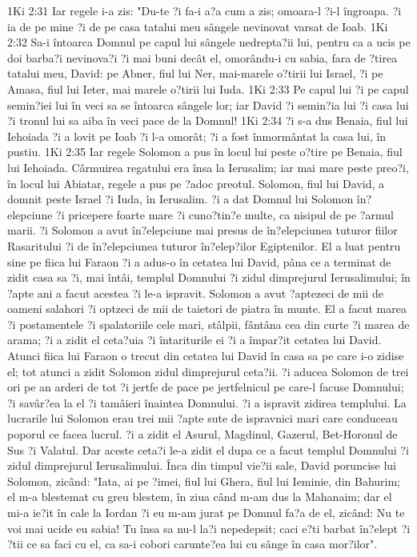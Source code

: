 1Ki 2:31  Iar regele i-a zis: "Du-te ?i fa-i a?a cum a zis; omoara-l ?i-l îngroapa. ?i ia de pe mine ?i de pe casa tatalui meu sângele nevinovat varsat de Ioab.
1Ki 2:32  Sa-i întoarca Domnul pe capul lui sângele nedrepta?ii lui, pentru ca a ucis pe doi barba?i nevinova?i ?i mai buni decât el, omorându-i cu sabia, fara de ?tirea tatalui meu, David: pe Abner, fiul lui Ner, mai-marele o?tirii lui Israel, ?i pe Amasa, fiul lui Ieter, mai marele o?tirii lui Iuda.
1Ki 2:33  Pe capul lui ?i pe capul semin?iei lui în veci sa se întoarca sângele lor; iar David ?i semin?ia lui ?i casa lui ?i tronul lui sa aiba în veci pace de la Domnul!
1Ki 2:34  ?i s-a dus Benaia, fiul lui Iehoiada ?i a lovit pe Ioab ?i l-a omorât; ?i a fost înmormântat la casa lui, în pustiu.
1Ki 2:35  Iar regele Solomon a pus în locul lui peste o?tire pe Benaia, fiul lui Iehoiada. Cârmuirea regatului era însa la Ierusalim; iar mai mare peste preo?i, în locul lui Abiatar, regele a pus pe ?adoc preotul. Solomon, fiul lui David, a domnit peste Israel ?i Iuda, în Ierusalim. ?i a dat Domnul lui Solomon în?elepciune ?i pricepere foarte mare ?i cuno?tin?e multe, ca nisipul de pe ?armul marii. ?i Solomon a avut în?elepciune mai presus de în?elepciunea tuturor fiilor Rasaritului ?i de în?elepciunea tuturor în?elep?ilor Egiptenilor. El a luat pentru sine pe fiica lui Faraon ?i a adus-o în cetatea lui David, pâna ce a terminat de zidit casa sa ?i, mai întâi, templul Domnului ?i zidul dimprejurul Ierusalimului; în ?apte ani a facut acestea ?i le-a ispravit. Solomon a avut ?aptezeci de mii de oameni salahori ?i optzeci de mii de taietori de piatra în munte. El a facut marea ?i postamentele ?i spalatoriile cele mari, stâlpii, fântâna cea din curte ?i marea de arama; ?i a zidit el ceta?uia ?i întariturile ei ?i a împar?it cetatea lui David. Atunci fiica lui Faraon o trecut din cetatea lui David în casa sa pe care i-o zidise el; tot atunci a zidit Solomon zidul dimprejurul ceta?ii. ?i aducea Solomon de trei ori pe an arderi de tot ?i jertfe de pace pe jertfelnicul pe care-l facuse Domnului; ?i savâr?ea la el ?i tamâieri înaintea Domnului. ?i a ispravit zidirea templului. La lucrarile lui Solomon erau trei mii ?apte sute de ispravnici mari care conduceau poporul ce facea lucrul. ?i a zidit el Asurul, Magdinul, Gazerul, Bet-Horonul de Sus ?i Valatul. Dar aceste ceta?i le-a zidit el dupa ce a facut templul Domnului ?i zidul dimprejurul Ierusalimului. Înca din timpul vie?ii sale, David poruncise lui Solomon, zicând: "Iata, ai pe ?imei, fiul lui Ghera, fiul lui Ieminie, din Bahurim; el m-a blestemat cu greu blestem, în ziua când m-am dus la Mahanaim; dar el mi-a ie?it în cale la Iordan ?i eu m-am jurat pe Domnul fa?a de el, zicând: Nu te voi mai ucide eu sabia! Tu însa sa nu-l la?i nepedepsit; caci e?ti barbat în?elept ?i ?tii ce sa faci cu el, ca sa-i cobori carunte?ea lui cu sânge în casa mor?ilor".
